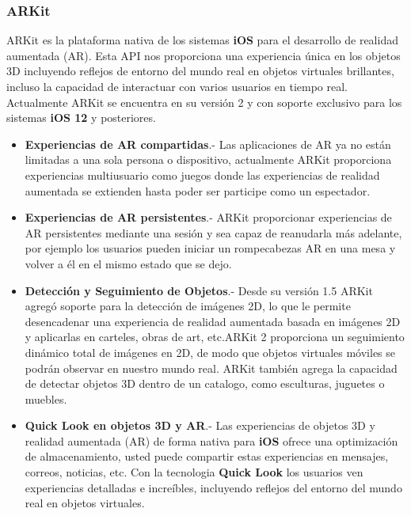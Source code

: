 \subsubsection{ARKit}
ARKit es la plataforma nativa de los sistemas \textbf{iOS} para el desarrollo de realidad aumentada (AR). Esta API nos proporciona una experiencia única en los objetos 3D incluyendo reflejos de entorno del mundo real en objetos virtuales brillantes, incluso la capacidad de interactuar con varios usuarios en tiempo real. Actualmente ARKit se encuentra en su versión 2 y con soporte exclusivo para los sistemas \textbf{iOS 12} y posteriores\cite{B20}.
\begin{itemize}
	\item \textbf{Experiencias de AR compartidas}.- Las aplicaciones de AR ya no están limitadas a una sola persona o dispositivo, actualmente ARKit proporciona experiencias multiusuario como juegos donde las experiencias de realidad aumentada se extienden hasta poder ser participe como un espectador.
	\item \textbf{Experiencias de AR persistentes}.- ARKit proporcionar experiencias de AR persistentes mediante una sesión y sea capaz de reanudarla más adelante, por ejemplo los usuarios pueden iniciar un rompecabezas AR en una mesa y volver a él en el mismo estado que se dejo.

	\item \textbf{Detección y Seguimiento de Objetos}.- Desde su versión 1.5  ARKit agregó soporte para la detección de imágenes 2D, lo que le permite desencadenar una experiencia de realidad aumentada basada en imágenes 2D y aplicarlas en  carteles, obras de art, etc.ARKit 2 proporciona un seguimiento dinámico total de imágenes en 2D, de modo que objetos virtuales móviles se podrán observar en nuestro mundo real. ARKit también agrega la capacidad de detectar objetos 3D dentro de un catalogo, como esculturas, juguetes o muebles.
	\item \textbf{Quick Look en objetos 3D y AR}.- Las experiencias de objetos 3D y realidad aumentada (AR) de forma nativa para \textbf{iOS} ofrece una optimización de almacenamiento, usted puede compartir estas experiencias en mensajes, correos, noticias, etc. Con la tecnologia \textbf{Quick Look} los usuarios ven experiencias detalladas e increíbles, incluyendo reflejos del entorno del mundo real en objetos virtuales.
\end{itemize}
